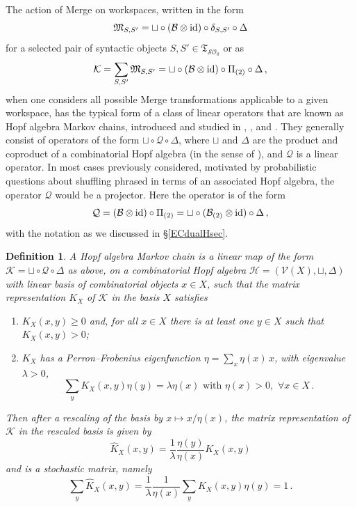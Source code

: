 \documentclass[12pt]{amsart}
\newtheorem{defn}[prop]{Definition}
\numberwithin{equation}{section}
\def\cB{{\mathcal B}}
\def\cH{{\mathcal H}}
\def\cK{{\mathcal K}}
\def\cO{{\mathcal O}}
\def\cQ{{\mathcal Q}}
\def\cS{{\mathcal S}}
\def\cV{{\mathcal V}}
\def\fM{{\mathfrak M}}
\def\fT{{\mathfrak T}}
\begin{document}
The action of Merge on workspaces, written in the form
$$ \fM_{S,S'}=\sqcup \circ (\cB \otimes {\rm id} )\circ \delta_{S,S'} \circ \Delta $$
for a selected pair of syntactic objects $S,S'\in \fT_{\cS\cO_0}$ or as
$$ \cK = \sum_{S,S'} \fM_{S,S'}=\sqcup \circ (\cB \otimes {\rm id} )\circ \Pi_{(2)} \circ \Delta\, , $$
when one considers all possible Merge transformations applicable to a given workspace, 
has the typical form of a class of linear operators that are known as
Hopf algebra Markov chains, introduced and studied in \cite{DiPaRa},
\cite{Pang}, and \cite{Pang2}. They generally consist of operators of the
form $\sqcup \circ \cQ \circ \Delta$, where $\sqcup$ and $\Delta$ are the
product and coproduct of a combinatorial Hopf algebra (in the sense of 
\cite{LodayRoncoComb}), and $\cQ$ is a linear operator. In most cases
previously considered, motivated by probabilistic questions about shuffling 
phrased in terms of an associated Hopf algebra, the operator $\cQ$ 
would be a projector. Here the operator is of the form 
$$  \cQ=(\cB\otimes {\rm id})\circ \Pi_{(2)} =  \sqcup \circ (\cB_{(2)}\otimes {\rm id}) \circ \Delta \, ,   $$
with the notation as we discussed in \S \ref{ECdualHsec}. 

\smallskip

\begin{defn}\label{HopfMarkov}
A Hopf algebra Markov chain is a linear map of the form $\cK=\sqcup \circ \cQ \circ \Delta$ as above,
on a combinatorial Hopf algebra $\cH=(\cV(X),\sqcup,\Delta)$ with linear basis of combinatorial objects
$x\in X$, such that the matrix representation $K_X$ of $\cK$ in the basis $X$ satisfies 
\begin{enumerate}
\item $K_X(x,y)\geq 0$ and, for all $x\in X$ there is at least one $y\in X$ such that $K_X(x,y)>0$;
\item $K_X$ has a Perron--Frobenius eigenfunction $\eta=\sum_x \eta(x)\, x$, with eigenvalue $\lambda>0$, 
$$ \sum_y K_X(x,y) \eta(y)=\lambda \eta(x) \text{ with } \eta(x)> 0, \,\, \forall x\in X\, . $$
\end{enumerate}
Then after a rescaling of the basis by $x\mapsto x/\eta(x)$, the matrix representation of $\cK$ in
the rescaled basis is given by
$$ \hat K_X(x,y) = \frac{1}{\lambda} \frac{\eta(y)}{\eta(x)} K_X(x,y) $$
and is a stochastic matrix, namely
$$ \sum_y \hat K_X(x,y) = \frac{1}{\lambda} \frac{1}{\eta(x)} \sum_y  K_X(x,y) \eta(y)= 1 \, . $$
\end{defn}

\smallskip
\end{document}
